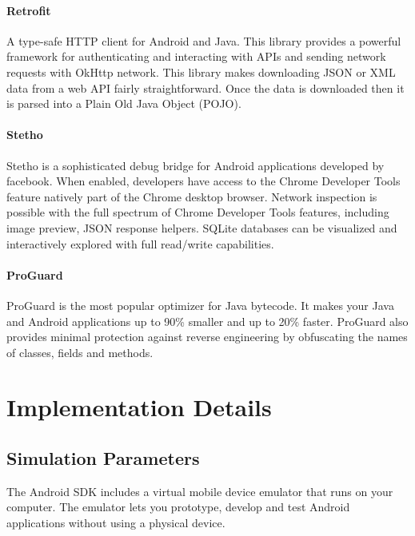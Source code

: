 \documentclass[BTech]{srmuthesis}
\begin{document}
\paragraph{Retrofit}
A type-safe HTTP client for Android and Java.
This library provides a powerful framework for authenticating and interacting with \ac{API}s and sending network requests with OkHttp network.
This library makes downloading JSON or XML data from a web \ac{API} fairly straightforward. Once the data is downloaded then it is parsed into a Plain Old Java Object (POJO).
\paragraph{Stetho}
Stetho is a sophisticated debug bridge for Android applications developed by facebook. When enabled, developers have access to the Chrome Developer Tools feature natively part of the Chrome desktop browser.
Network inspection is possible with the full spectrum of Chrome Developer Tools features, including image preview, JSON response helpers.
SQLite databases can be visualized and interactively explored with full read/write capabilities.
\paragraph{ProGuard}
ProGuard is the most popular optimizer for Java bytecode. It makes your Java and Android applications up to 90\% smaller and up to 20\% faster. ProGuard also provides minimal protection against reverse engineering by obfuscating the names of classes, fields and methods.
\section{Implementation Details}

\subsection{Simulation Parameters}
The Android SDK includes a virtual mobile device emulator that runs on your computer. The emulator lets you prototype, develop and test Android applications without using a physical device.
\end{document}
